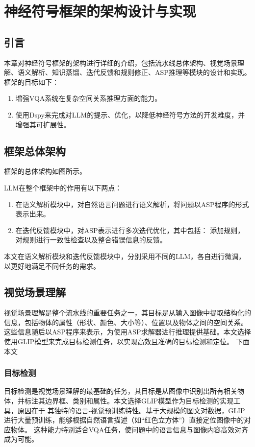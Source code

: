 \chapter{神经符号框架的架构设计与实现}
\section{引言}
本章对神经符号框架的架构进行详细的介绍，包括流水线总体架构、视觉场景理解、语义解析、知识蒸馏、迭代反馈和规则修正、ASP推理等模块的设计和实现。
框架的目标如下：
\begin{enumerate}[label=(\arabic*),itemsep=0pt,parsep=0pt]
\item 增强VQA系统在复杂空间关系推理方面的能力。
\item 使用Dspy来完成对LLM的提示、优化，以降低神经符号方法的开发难度，并增强其可扩展性。
\end{enumerate}
\section{框架总体架构}
框架的总体架构如图所示。

LLM在整个框架中的作用有以下两点：
\begin{enumerate}[label=(\arabic*),itemsep=0pt,parsep=0pt]
    \item 在语义解析模块中，对自然语言问题进行语义解析，将问题以ASP程序的形式表示出来。
    \item 在迭代反馈模块中，对ASP表示进行多次迭代优化，其中包括：
添加规则，对规则进行一致性检查以及整合错误信息的反馈。
\end{enumerate}

本文在语义解析模块和迭代反馈模块中，分别采用不同的LLM，各自进行微调，以更好地满足不同任务的需求。
\section{视觉场景理解}
视觉场景理解是整个流水线的重要任务之一，其目标是从输入图像中提取结构化的信息，包括物体的属性（形状、颜色、大小等）、位置以及物体之间的空间关系。
这些信息随后以ASP程序来表示，为使用ASP求解器进行推理提供基础。本文选择使用GLIP模型来完成目标检测任务，以实现高效且准确的目标检测和定位。
下面本文
\subsection{目标检测}
目标检测是视觉场景理解的最基础的任务，其目标是从图像中识别出所有相关物体，并标注其边界框、类别和属性。本文选择GLIP模型作为目标检测的实现工具，原因在于
其独特的语言-视觉预训练特性。基于大规模的图文对数据，GLIP进行大量预训练，能够根据自然语言描述（如“红色立方体”）直接定位图像中的对应物体。
这种能力特别适合VQA任务，使问题中的语言信息与图像内容高效对齐成为可能。

